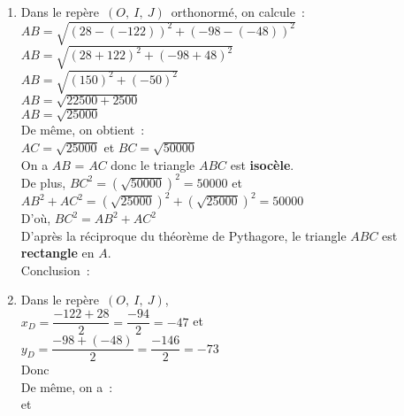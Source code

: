 \documentclass[a4paper,12pt,twocolumn,landscape]{article}
\newcommand{\rep}[3]{~$\left(#1,~#2,~#3\right)$}
\begin{document}
\vspace*{0.5em}

\begin{minipage}{0.45\textwidth}
\thispagestyle{firststyle}



\exercice
\begin{enumerate}
	\item Dans le repère\rep{O}{I}{J}~orthonormé, on calcule~:\\ $AB=\sqrt{\left(28 - \left( -122 \right) \right) ^ 2 + \left(-98 - \left( -48 \right) \right) ^ 2}$\\
			$AB=\sqrt{\left(28 + 122 \right) ^ 2 + \left(-98 + 48 \right) ^ 2}$\\
			$AB=\sqrt{\left(150 \right) ^ 2 + \left( - 50 \right) ^ 2}$\\
			$AB=\sqrt{22500 + 2500}$\\
			$AB=\sqrt{25000}$\\[1em]
			De même, on obtient~:\\ $AC = \sqrt{25000}$ et $BC = \sqrt{50000}$\\[1em]
			On a $AB$ = $AC$ donc le triangle $ABC$ est \textbf{isocèle}.\\[1em]
			De plus, $BC^2 = \left(\sqrt{50000}\right)^2 = 50000$ et\\ $AB^2 + AC^2 = \left(\sqrt{25000}\right)^2 + \left(\sqrt{25000}\right)^2 = 50000$\\
			D'où, $BC^2 = AB^2 + AC^2$\\
			D'après la réciproque du théorème de Pythagore, le triangle $ABC$ est \textbf{rectangle} en $A$.\\[1em]
			Conclusion~: \\
	\item Dans le repère\rep{O}{I}{J},\\[1em]
			$x_D = \dfrac{-122 + 28}{2} = \dfrac{-94}{2} = -47$ et\\
			$y_D = \dfrac{-98 + (-48)}{2} = \dfrac{-146}{2} = -73$\\[1em]
			Donc \\[1em]
			De même, on a~:\\[1em]  et 
\end{enumerate}

\end{minipage}
\end{document}

